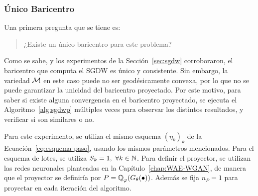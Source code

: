 \subsubsection{Único Baricentro}\label{sssec:sgdwp-unico-bar}  %


Una primera pregunta que se tiene es:
\begin{quotation}
    \centering
    ¿Existe un único baricentro para este problema?
\end{quotation}
Como se sabe, y los experimentos de la Sección~\ref{sec:sgdw} corroboraron, el baricentro que computa el SGDW es único y consistente. Sin embargo, la variedad $\operatorname{\mathcal{M}}$ en este caso puede no ser geodésicamente convexa, por lo que no se puede garantizar la unicidad del baricentro proyectado. Por este motivo, para saber si existe alguna convergencia en el baricentro proyectado, se ejecuta el Algoritmo~\ref{alg:sgdwp} múltiples veces para observar los distintos resultados, y verificar si son similares o no.

Para este experimento, se utiliza el mismo esquema $(\eta_k)_k$ de la Ecuación~\ref{eq:esquema-paso}, usando los mismos parámetros mencionados. Para el esquema de lotes, se utiliza $S_k=1,\ \forall k \in \mathbb{N}$. Para definir el proyector, se utilizan las redes neuronales planteadas en la Capítulo~\ref{chap:WAE-WGAN}, de manera que el proyector se definiría por $P = \ProbQ_\varphi (G_\theta (\bullet))$. Además se fija $n_P=1$ para proyectar en cada iteración del algoritmo.

